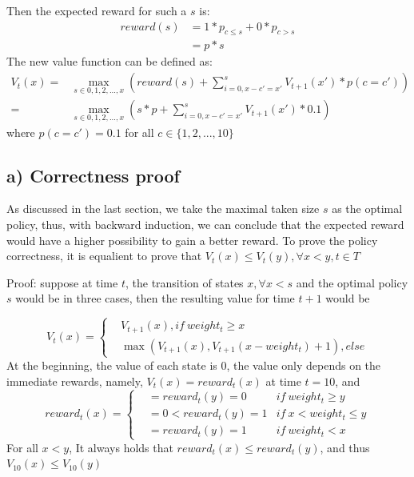 Then the expected reward for such a $s$ is:
\begin{equation}
    \begin{aligned}
    reward(s)  
    & =1*p_{c\leq s} + 0 * p_{c > s}\\
    & =p*s
    \end{aligned}
\end{equation}
The new value function can be defined as:
\begin{equation}
\begin{aligned}
    V_t(x) = &\max_{s\in {0,1,2,...,x}}(reward(s) + \sum\limits_{i=0,x-c'=x'}^s V_{t+1}(x')*p(c=c'))\\
    =&\max_{s\in {0,1,2,...,x}}(s*p + \sum\limits_{i=0,x-c'=x'}^s V_{t+1}(x')*0.1)
\end{aligned}
\end{equation}
where $p(c=c')=0.1$ for all $c\in \{1,2,...,10\}$
\subsection{a) Correctness proof}
As discussed in the last section, we take the maximal taken size $s$ as the optimal policy, thus, with backward induction, we can conclude that the expected reward would have a higher possibility to gain a better reward. To prove the policy correctness, it is equalient to prove that $V_t(x) \leq V_t(y), \forall x < y,t\in T$

Proof:
suppose at time $t$, the transition of states $x,\forall x < s$ and the optimal policy $s$ would be in three cases, then the resulting value for time $t+1$ would be

\begin{equation}
    V_{t}(x) = \left\{
    \begin{aligned}
    &V_{t+1}(x), if\ weight_t \ge x \\
    &\max (V_{t+1}(x), V_{t+1}(x-weight_t) + 1), else
\end{aligned}
\right.
\end{equation}
At the beginning, the value of each state is 0, the value only depends on the immediate rewards, namely, $V_t(x)=reward_t(x)$ at time $t=10$, and 
\begin{equation}
    reward_{t}(x) = \left\{
    \begin{aligned}
    & = reward_{t}(y) = 0 &if\ weight_t \ge y \\
    & = 0 < reward_t(y) = 1& if\ x < weight_t \leq y\\
    & = reward_t(y) = 1 & if\ weight_t < x
\end{aligned}
\right.
\end{equation}
For all $x<y$, It always holds that $reward_{t}(x)\leq reward_{t}(y)$, and thus $V_{10}(x) \leq V_{10}(y)$
 
